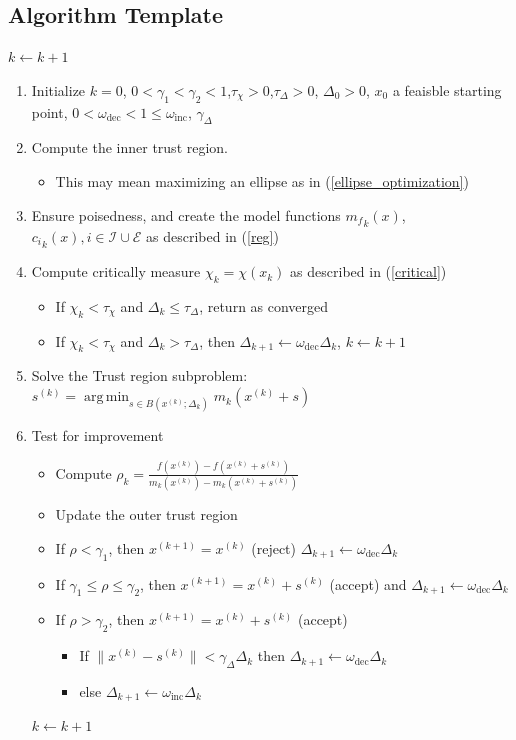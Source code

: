 \documentclass{article}
\DeclareMathOperator*{\argmin}{arg\,min}
\let\oldref\ref
\renewcommand{\ref}[1]{(\oldref{#1})}
\begin{document}
\subsection{Algorithm Template}



$k \leftarrow k + 1$


\begin{enumerate}
    \item Initialize $k=0$, $0<\gamma_1<\gamma_2<1$,$\tau_{\chi}>0$,$\tau_{\Delta}>0$, $\Delta_0 > 0$, $x_0$ a feaisble starting point, $0<\omega_{\text{dec}} < 1 \le \omega_{\text{inc}}$, $\gamma_{\Delta}$
    \item Compute the inner trust region.
    \begin{itemize}
        \item This may mean maximizing an ellipse as in \ref{ellipse_optimization}
    \end{itemize}
	\item Ensure poisedness, and create the model functions ${m_f}_k(x)$, ${c_i}_k(x), i \in \mathcal I \cup \mathcal E$ as described in \ref{reg}
	\item Compute critically measure $\chi_k = \chi(x_k)$ as described in \ref{critical}
    \begin{itemize}
        \item If $\chi_k < \tau_{\chi}$ and $\Delta_k \le \tau_{\Delta}$, return as converged
        \item If $\chi_k < \tau_{\chi}$ and $\Delta_k > \tau_{\Delta}$, then $\Delta_{k+1} \leftarrow \omega_{\text{dec}} \Delta_k$, $k \leftarrow k + 1$
    \end{itemize}
	
	\item Solve the Trust region subproblem: $s^{(k)} = \argmin_{s\in B(x^{(k)};\Delta_k)} m_k(x^{(k)} + s)$
	
	\item Test for improvement
	\begin{itemize}
		\item Compute $\rho_k = \frac{f(x^{(k)}) - f(x^{(k)}+s^{(k)})}{m_k(x^{(k)}) - m_k(x^{(k)}+s^{(k)})}$
    \item Update the outer trust region
		\item If $\rho < \gamma_1$, then $x^{(k+1)}=x^{(k)}$ (reject) $\Delta_{k+1} \leftarrow \omega_{\text{dec}} \Delta_k$
		\item If $\gamma_1 \le \rho \le \gamma_2$, then $x^{(k+1)}=x^{(k)}+s^{(k)}$ (accept) and $\Delta_{k+1} \leftarrow \omega_{\text{dec}} \Delta_k$
		\item If $\rho > \gamma_2$, then $x^{(k+1)}=x^{(k)}+s^{(k)}$ (accept)
		\begin{itemize}
            \item If $\|x^{(k)} - s^{(k)} \| < \gamma_{\Delta} \Delta_k$ then $\Delta_{k+1} \leftarrow \omega_{\text{dec}} \Delta_k$
            \item else $\Delta_{k+1} \leftarrow \omega_{\text{inc}} \Delta_k$
		\end{itemize}
	\end{itemize}
    $k \leftarrow k + 1$
	

\end{enumerate}
\end{document}
